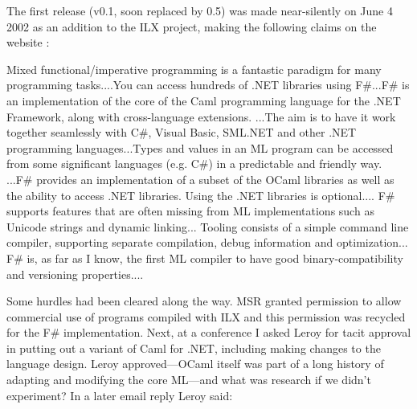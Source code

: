 \documentclass[acmsmall,screen]{acmart}
\begin{document}
The first release (v0.1, soon replaced by 0.5) was made near-silently on June 4 2002 as an addition to the ILX project, making the following
claims on the website \citep{RefIlxPage}:
\begin{verbquote}
Mixed functional/imperative programming is a fantastic paradigm for many programming tasks....You can access hundreds of .NET libraries using F#...F# is an implementation of the core of the Caml programming language for the .NET Framework, along with cross-language extensions. ...The aim is to have it work together seamlessly with C#, Visual Basic, SML.NET and other .NET programming languages...Types and values in an ML program can be accessed from some significant languages (e.g. C#) in a predictable and friendly way. ...F# provides an implementation of a subset of the OCaml libraries as well as the ability to access .NET libraries.  Using the .NET libraries is optional.... F# supports features that are often missing from ML implementations such as Unicode strings and dynamic linking... Tooling consists of a simple command line compiler, supporting separate compilation, debug information and optimization... F# is, as far as I know, the first ML compiler to have good binary-compatibility and versioning properties....
\end{verbquote}

Some hurdles had been cleared along the way. MSR granted permission to allow commercial use of programs compiled with ILX and this
permission was recycled for the F\# implementation. Next, at a conference I asked Leroy for tacit approval in putting out a variant of
Caml for .NET, including making changes to the language design.  Leroy approved---OCaml itself was part of a long history of adapting
and modifying the core ML---and what was research if we didn’t experiment?  In a later email reply Leroy said:
\end{document}

